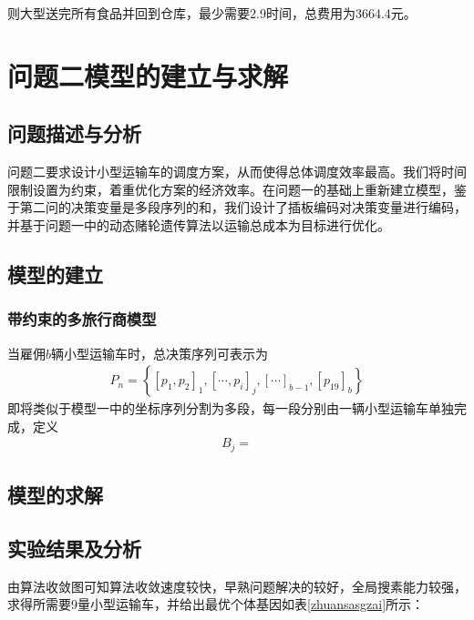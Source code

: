 \documentclass{whutmod}
\begin{document}
     则大型送完所有食品并回到仓库，最少需要2.9时间，总费用为3664.4元。
     
	  \section{问题二模型的建立与求解}
	  \subsection{问题描述与分析}
	  问题二要求设计小型运输车的调度方案，从而使得总体调度效率最高。我们将时间限制设置为约束，着重优化方案的经济效率。在问题一的基础上重新建立模型，鉴于第二问的决策变量是多段序列的和，我们设计了插板编码对决策变量进行编码，并基于问题一中的动态赌轮遗传算法以运输总成本为目标进行优化。
	  \subsection{模型的建立}
	  \subsubsection{带约束的多旅行商模型}
	  当雇佣$b$辆小型运输车时，总决策序列可表示为
	  \begin{gather}
	  P_n=\left \{[p_{1},p_{2}]_1,[\cdots,p_{i}]_j,[\cdots]_{b-1},[p_{19}]_b\right \}
	  \end{gather}
	  即将类似于模型一中的坐标序列分割为多段，每一段分别由一辆小型运输车单独完成，定义
	  \begin{gather}
	  B_j=
	  \end{gather}
      \subsection{模型的求解}

 
  
        \subsection{实验结果及分析}
%  
%  
  
  由算法收敛图可知算法收敛速度较快，早熟问题解决的较好，全局搜素能力较强， 求得所需要9量小型运输车，并给出最优个体基因如表\ref{zhuansasgzai}所示：%
  
\end{document}
